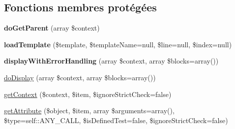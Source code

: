 \subsection*{Fonctions membres protégées}
\begin{DoxyCompactItemize}
\item 
{\bfseries do\+Get\+Parent} (array \$context)\hypertarget{class_twig___template_a8a2d1d26863a5dbc3220201cdb4e3b0c}{}\label{class_twig___template_a8a2d1d26863a5dbc3220201cdb4e3b0c}

\item 
{\bfseries load\+Template} (\$template, \$template\+Name=null, \$line=null, \$index=null)\hypertarget{class_twig___template_a838c5ee902977925f3ed5872570053b9}{}\label{class_twig___template_a838c5ee902977925f3ed5872570053b9}

\item 
{\bfseries display\+With\+Error\+Handling} (array \$context, array \$blocks=array())\hypertarget{class_twig___template_a6e13737c743406fb98c6ac9e00632fd7}{}\label{class_twig___template_a6e13737c743406fb98c6ac9e00632fd7}

\item 
\hyperlink{class_twig___template_adb62b7c226e07d30f836ed16158d924f}{do\+Display} (array \$context, array \$blocks=array())
\item 
\hyperlink{class_twig___template_a37b7cef4c38cbf5ee6161263eab83075}{get\+Context} (\$context, \$item, \$ignore\+Strict\+Check=false)
\item 
\hyperlink{class_twig___template_ab691da5b74a111ded60994f4984a3405}{get\+Attribute} (\$object, \$item, array \$arguments=array(), \$type=self\+::\+A\+N\+Y\+\_\+\+C\+A\+LL, \$is\+Defined\+Test=false, \$ignore\+Strict\+Check=false)
\end{DoxyCompactItemize}
